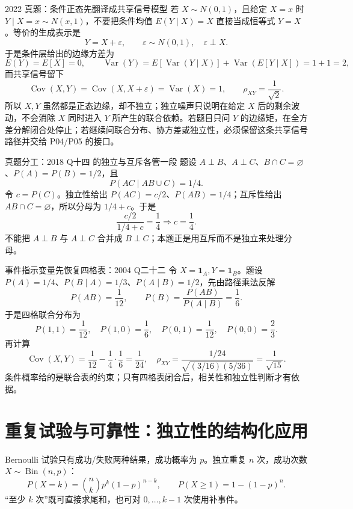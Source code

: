 \documentclass[11pt,a4paper]{ctexart}
\begin{document}
\begin{examplebox}{2022 真题：条件正态先翻译成共享信号模型}
若 $X\sim N(0,1)$，且给定 $X=x$ 时 $Y\mid X=x\sim N(x,1)$，不要把条件均值 $E(Y\mid X)=X$ 直接当成恒等式 $Y=X$。等价的生成表示是
\[
Y=X+\varepsilon,\qquad \varepsilon\sim N(0,1),\quad \varepsilon\perp X.
\]
于是条件层给出的边缘方差为
\[
E(Y)=E[X]=0,\qquad
\operatorname{Var}(Y)=E[\operatorname{Var}(Y\mid X)]+\operatorname{Var}(E[Y\mid X])=1+1=2,
\]
而共享信号留下
\[
\operatorname{Cov}(X,Y)=\operatorname{Cov}(X,X+\varepsilon)=\operatorname{Var}(X)=1,
\qquad
\rho_{XY}=\frac1{\sqrt2}.
\]
所以 $X,Y$ 虽然都是正态边缘，却不独立；独立噪声只说明在给定 $X$ 后的剩余波动，不会消除 $X$ 同时进入 $Y$ 所产生的联合依赖。若题目只问 $Y$ 的边缘矩，在全方差分解闭合处停止；若继续问联合分布、协方差或独立性，必须保留这条共享信号路径并交给 P04/P05 的接口。
\end{examplebox}

\begin{examplebox}{真题分工：2018 Q十四 的独立与互斥各管一段}
题设 $A\perp B$、$A\perp C$、$B\cap C=\varnothing$、$P(A)=P(B)=1/2$，且
\[
P(AC\mid AB\cup C)=1/4.
\]
令 $c=P(C)$。独立性给出 $P(AC)=c/2$、$P(AB)=1/4$；互斥性给出 $AB\cap C=\varnothing$，所以分母为 $1/4+c$。于是
\[
\frac{c/2}{1/4+c}=\frac14\Longrightarrow c=\frac14.
\]
不能把 $A\perp B$ 与 $A\perp C$ 合并成 $B\perp C$；本题正是用互斥而不是独立来处理分母。
\end{examplebox}

\begin{examplebox}{事件指示变量先恢复四格表：2004 Q二十二}
令 $X=\mathbf1_A,Y=\mathbf1_B$。题设 $P(A)=1/4$、$P(B\mid A)=1/3$、$P(A\mid B)=1/2$，先由路径乘法反解
\[
P(AB)=\frac1{12},\qquad P(B)=\frac{P(AB)}{P(A\mid B)}=\frac16.
\]
于是四格联合分布为
\[
P(1,1)=\frac1{12},\quad P(1,0)=\frac16,
\quad P(0,1)=\frac1{12},\quad P(0,0)=\frac23.
\]
再计算
\[
\operatorname{Cov}(X,Y)=\frac1{12}-\frac14\cdot\frac16=\frac1{24},\quad
\rho_{XY}=\frac{1/24}{\sqrt{(3/16)(5/36)}}=\frac1{\sqrt{15}}.
\]
条件概率给的是联合表的约束；只有四格表闭合后，相关性和独立性判断才有依据。
\end{examplebox}

\section{重复试验与可靠性：独立性的结构化应用}

Bernoulli 试验只有成功/失败两种结果，成功概率为 $p$。独立重复 $n$ 次，成功次数 $X\sim\operatorname{Bin}(n,p)$：
\[
P(X=k)=\binom nkp^k(1-p)^{n-k},\qquad
P(X\ge1)=1-(1-p)^n.
\]
“至少 $k$ 次”既可直接求尾和，也可对 $0,\ldots,k-1$ 次使用补事件。
\end{document}
